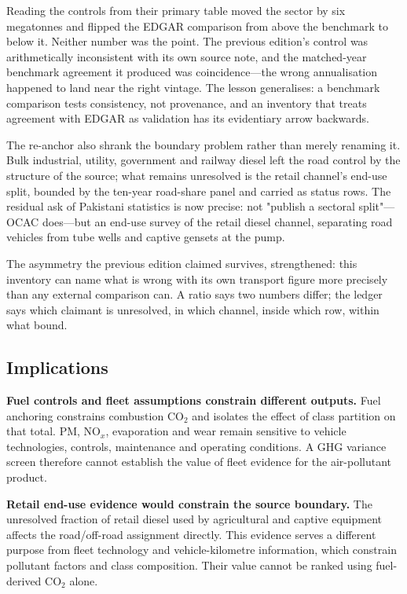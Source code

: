 Reading the controls from their primary table moved the sector by six megatonnes and
flipped the EDGAR comparison from above the benchmark to below it. Neither number was
the point. The previous edition's control was arithmetically inconsistent with its own
source note, and the matched-year benchmark agreement it produced was coincidence---the
wrong annualisation happened to land near the right vintage. The lesson generalises: a
benchmark comparison tests consistency, not provenance, and an inventory that treats
agreement with EDGAR as validation has its evidentiary arrow backwards.

The re-anchor also shrank the boundary problem rather than merely renaming it. Bulk
industrial, utility, government and railway diesel left the road control by the structure
of the source; what remains unresolved is the retail channel's end-use split, bounded by
the ten-year road-share panel and carried as status rows. The residual ask of Pakistani
statistics is now precise: not "publish a sectoral split"---OCAC does---but an end-use
survey of the retail diesel channel, separating road vehicles from tube wells and captive
gensets at the pump.

The asymmetry the previous edition claimed survives, strengthened: this inventory can name
what is wrong with its own transport figure more precisely than any external comparison
can. A ratio says two numbers differ; the ledger says which claimant is unresolved, in
which channel, inside which row, within what bound.

\subsection{Implications}

\textbf{Fuel controls and fleet assumptions constrain different outputs.} Fuel anchoring constrains combustion CO$_2$ and isolates the effect of class partition on that total. PM, NO$_x$, evaporation and wear remain sensitive to vehicle technologies, controls, maintenance and operating conditions. A GHG variance screen therefore cannot establish the value of fleet evidence for the air-pollutant product.

\textbf{Retail end-use evidence would constrain the source boundary.} The unresolved fraction of retail diesel used by agricultural and captive equipment affects the road/off-road assignment directly. This evidence serves a different purpose from fleet technology and vehicle-kilometre information, which constrain pollutant factors and class composition. Their value cannot be ranked using fuel-derived CO$_2$ alone.

